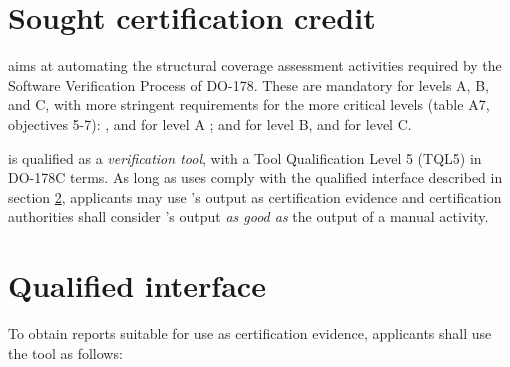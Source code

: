 \documentclass {report}
\begin{document}
\section {Sought certification credit}

\xcov{} aims at automating the structural coverage assessment activities
required by the Software Verification Process of DO-178.
%
These  are mandatory for levels A, B, and C, with more stringent
requirements for the more critical levels (table A7, objectives 5-7): \mcdc{},
\dc{} and \stc{} for level A ; \dc{} and \stc{} for level B, and \stc{} for
 level C.

\xcov{} is qualified as a \emph{verification tool}, with a Tool Qualification
Level 5 (TQL5) in DO-178C terms.
%
As long as uses comply with the qualified interface described in
section \ref{sec:qual-interface}, applicants may use \xcov{}'s output as
certification evidence and certification authorities shall consider \xcov{}'s
output \emph{as good as} the output of a manual activity.

\section{Qualified interface}
\label{sec:qual-interface}

To obtain reports suitable for use as certification evidence, applicants
shall use the \xcov{} tool as follows:
\end{document}
